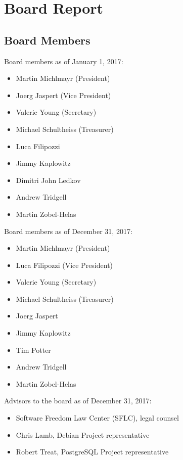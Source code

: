 \documentclass[a4paper]{report}
\begin{document}
\chapter{Board Report}
\section{Board Members}

Board members as of January 1, 2017:

\begin{itemize}
\item Martin Michlmayr (President)
\item Joerg Jaspert (Vice President)
\item Valerie Young (Secretary)
\item Michael Schultheiss (Treasurer)
\item Luca Filipozzi
\item Jimmy Kaplowitz
\item Dimitri John Ledkov
\item Andrew Tridgell
\item Martin Zobel-Helas
\end{itemize}

Board members as of December 31, 2017:

\begin{itemize}
\item Martin Michlmayr (President)
\item Luca Filipozzi (Vice President)
\item Valerie Young (Secretary)
\item Michael Schultheiss (Treasurer)
\item Joerg Jaspert
\item Jimmy Kaplowitz
\item Tim Potter
\item Andrew Tridgell
\item Martin Zobel-Helas
\end{itemize}

Advisors to the board as of December 31, 2017:

\begin{itemize}
\item Software Freedom Law Center (SFLC), legal counsel
\item Chris Lamb, Debian Project representative
\item Robert Treat, PostgreSQL Project representative
\end{itemize}
\end{document}
